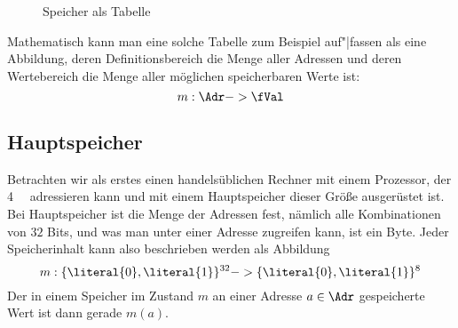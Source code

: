 \begin{figure}[ht]
  \centering
  \qquad
  \caption{Speicher als Tabelle}
  \label{abb:speicher-als-tabelle}
\end{figure}

\noindent
Mathematisch kann man eine solche Tabelle zum Beispiel auf"|fassen als
eine Abbildung, deren Definitionsbereich die Menge aller Adressen und
deren Wertebereich die Menge aller möglichen speicherbaren Werte
ist:
\[
m : \Adr -> \fVal
\]

\subsection{Hauptspeicher}

Betrachten wir als erstes einen handelsüblichen Rechner mit einem
Prozessor, der \SI{4}{\gibi\byte} adressieren kann und mit einem
Hauptspeicher dieser Größe ausgerüstet ist. Bei Hauptspeicher ist die
Menge der Adressen fest, nämlich alle Kombinationen von $32$ Bits, und
was man unter einer Adresse zugreifen kann, ist ein Byte. Jeder
Speicherinhalt kann also beschrieben werden als Abbildung
\[
m : \{\literal{0},\literal{1}\}^{32} -> \{\literal{0},\literal{1}\}^8
\]
Der in einem Speicher im Zustand $m$ an einer Adresse $a\in\Adr$
gespeicherte Wert ist dann gerade $m(a)$.

